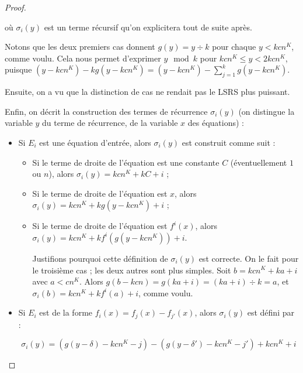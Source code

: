 \documentclass{report}
\begin{document}
\begin{proof}
\begin{enumerate}[itemsep=-1mm,leftmargin=2cm]
					où $\sigma_i(y)$ est un terme récursif qu'on explicitera tout de suite après. 
					
					Notons que les deux premiers cas donnent $g(y) = y \div k$ pour chaque $y < kcn^K$, comme voulu. Cela nous permet d'exprimer $y \mod{k}$ pour $kcn^K \leqslant y < 2kcn^K$, puisque $(y-kcn^K) - kg(y-kcn^K) = (y-kcn^K) - \sum_{j=1}^{k} g(y-kcn^K)$. 
					
					Ensuite, on a vu que la distinction de cas ne rendait pas le LSRS plus puissant. 
					
					Enfin, on décrit la construction des termes de récurrence $\sigma_i(y)$ (on distingue la variable $y$ du terme de récurrence, de la variable $x$ des équations) :
					
					\begin{itemize}[itemsep=-1mm, leftmargin=1cm]
						\item
							Si $E_i$ est une équation d'entrée, alors $\sigma_i(y)$ est construit comme suit :
					
							\begin{itemize}[itemsep=-1mm,leftmargin=1cm]
								\item %
								Si le terme de droite de l'équation est une constante $C$ (éventuellement $1$ ou $n$), alors $\sigma_i(y) = kcn^K + kC + i$ ;
								
								\item %
								Si le terme de droite de l'équation est $x$, alors $\sigma_i(y) = kcn^K + kg\left( y - kcn^K \right) + i$ ;
								
								\item %
								Si le terme de droite de l'équation est $f^i(x)$, alors $\sigma_i(y) = kcn^K + k f^i\left( g\left( y - kcn^K \right) \right) + i$.
								
								Justifions pourquoi cette définition de $\sigma_i(y)$ est correcte. On le fait pour le troisième cas ; les deux autres sont plus simples. Soit $b = kcn^K + ka + i$ avec $a < cn^K$. Alors $g(b-kcn) = g(ka + i) = (ka + i) \div k = a$, et $\sigma_i(b) = kcn^K + kf^i(a) + i$, comme voulu. 
							\end{itemize}
							
			
						\item
							Si $E_i$ est de la forme $f_i(x) = f_j(x) - f_{j'}(x)$, alors $\sigma_i(y)$ est défini par :
							
							\[
								\sigma_i(y) = \left( g(y - \delta) - k cn^K - j \right) - \left( g(y - \delta') - k cn^K - j' \right) + kcn^K + i
							\]
							

\end{itemize}
\end{enumerate}
\end{proof}
\end{document}
